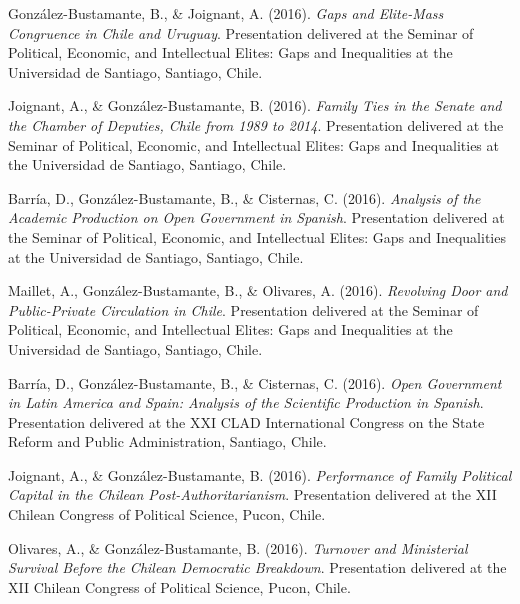 \begin{publications}
\begin{benumerate}{72}
\item{\small González-Bustamante, B., \& Joignant, A. (2016). {\itshape Gaps and Elite-Mass Congruence in Chile and Uruguay}. Presentation delivered at the Seminar of Political, Economic, and Intellectual Elites: Gaps and Inequalities at the Universidad de Santiago, Santiago, Chile.}\vspace{1mm}

\item{\small Joignant, A., \& González-Bustamante, B. (2016). {\itshape Family Ties in the Senate and the Chamber of Deputies, Chile from 1989 to 2014}. Presentation delivered at the Seminar of Political, Economic, and Intellectual Elites: Gaps and Inequalities at the Universidad de Santiago, Santiago, Chile.}\vspace{1mm}

\item{\small Barría, D., González-Bustamante, B., \& Cisternas, C. (2016). {\itshape Analysis of the Academic Production on Open Government in Spanish}. Presentation delivered at the Seminar of Political, Economic, and Intellectual Elites: Gaps and Inequalities at the Universidad de Santiago, Santiago, Chile.}\vspace{1mm}

\item{\small Maillet, A., González-Bustamante, B., \& Olivares, A. (2016). {\itshape Revolving Door and Public-Private Circulation in Chile}. Presentation delivered at the Seminar of Political, Economic, and Intellectual Elites: Gaps and Inequalities at the Universidad de Santiago, Santiago, Chile.}\vspace{1mm}

\item{\small Barría, D., González-Bustamante, B., \& Cisternas, C. (2016). {\itshape Open Government in Latin America and Spain: Analysis of the Scientific Production in Spanish}. Presentation delivered at the XXI CLAD International Congress on the State Reform and Public Administration, Santiago, Chile.}\vspace{1mm}

\item{\small Joignant, A., \& González-Bustamante, B. (2016). {\itshape Performance of Family Political Capital in the Chilean Post-Authoritarianism}. Presentation delivered at the XII Chilean Congress of Political Science, Pucon, Chile.}\vspace{1mm}

\item{\small Olivares, A., \& González-Bustamante, B. (2016). {\itshape Turnover and Ministerial Survival Before the Chilean Democratic Breakdown}. Presentation delivered at the XII Chilean Congress of Political Science, Pucon, Chile.}\vspace{1mm}


\end{benumerate}
\end{publications}
